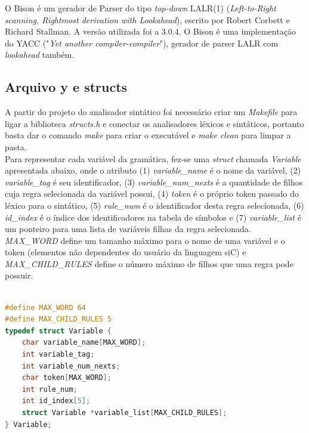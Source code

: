 \documentclass[12pt]{article}
\begin{document}
\indent O Bison é um gerador de Parser do tipo \textit{top-down} LALR(1) (\textit{Left-to-Right scanning, Rightmost derivation with Lookahead}), escrito por Robert Corbett e Richard Stallman. A versão utilizada foi a 3.0.4. O Bison é uma implementação do YACC ("\textit{Yet another compiler-compiler}"), gerador de parser LALR com \textit{lookahead} também.

\subsection{Arquivo y e structs}

\indent A partir do projeto do analisador sintático foi necessário criar um \textit{Makefile} para ligar a biblioteca \textit{structs.h} e conectar os analisadores léxicos e sintáticos, portanto basta dar o comando \textit{make} para criar o executável e \textit{make clean} para limpar a pasta. \\
\indent Para representar cada variável da gramática, fez-se uma \textit{struct} chamada \textit{Variable} apresentada abaixo, onde o atributo (1) \textit{variable\_name} é o nome da variável, (2) \textit{variable\_tag} é seu identificador, (3) \textit{variable\_num\_nexts} é a quantidade de filhos cuja regra selecionada da variável possui, (4) \textit{token} é o próprio token passado do léxico para o sintático, (5) \textit{rule\_num} é o identificador desta regra selecionada, (6) \textit{id\_index} é o índice dos identificadores na tabela de símbolos e  (7) \textit{variable\_list} é um ponteiro para uma lista de variáveis filhas da regra selecionada. \textit{MAX\_WORD} define um tamanho máximo para o nome de uma variável e o token (elementos não dependentes do usuário da linguagem siC) e \textit{MAX\_CHILD\_RULES} define o número máximo de filhos que uma regra pode possuir. \\
\begin{lstlisting}[language=C]

#define MAX_WORD 64
#define MAX_CHILD_RULES 5
typedef struct Variable {
    char variable_name[MAX_WORD];
    int variable_tag;
    int variable_num_nexts;
    char token[MAX_WORD];
    int rule_num;
    int id_index[5];
    struct Variable *variable_list[MAX_CHILD_RULES];
} Variable;

\end{lstlisting}
\end{document}
